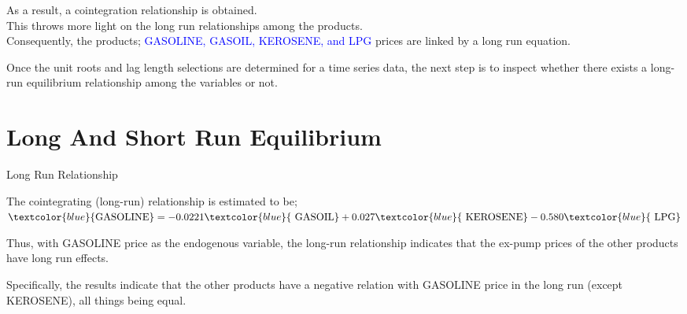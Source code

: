 \documentclass{beamer}
\newcommand{\vspaceFive}{\vspace{5pt}}
\newcommand{\vspaceTen}{\vspace{10pt}}
\newcommand{\colorPrimary}{blue}
\newcommand{\textPrimary}[1]{\textcolor{\colorPrimary}{#1}}
\begin{document}
	\begin{frame}
		\begin{block}{}
			As a result, a cointegration relationship is obtained. \\ 
			This throws more light on the long run relationships among the products.\\
			 Consequently, the products; \textPrimary{GASOLINE, GASOIL, KEROSENE, and LPG} prices are linked by a 
			long run equation. 
		\end{block}
	
		\begin{block}{}
			Once the unit roots and lag length selections are determined for a time series data, the next step is to inspect whether there exists a long-run equilibrium relationship among the variables or not.
		\end{block}
	\end{frame}
		
	
	\section{Long And Short Run Equilibrium}
	\begin{frame}{Long Run Relationship}
		\begin{block}{The cointegrating (long-run) relationship is estimated to be;}
			\vspaceFive
			\begin{math}
				\textPrimary{\text{GASOLINE}} = 
				- 0.0221 \textPrimary{\text{ GASOIL}} + 
				0.027 \textPrimary{\text{ KEROSENE}} - 
				0.580 \textPrimary{\text{ LPG}}
			\end{math}
			
			\vspaceFive 
		\end{block} 
		\vspaceFive
		
		Thus, with GASOLINE price as the endogenous variable, the long-run relationship indicates that the ex-pump prices of the other products have long run effects. \\ \vspaceTen
		
		Specifically, the results indicate that the other products have a negative relation with GASOLINE price in the long run (except KEROSENE), all things being equal.
	\end{frame}
\end{document}

